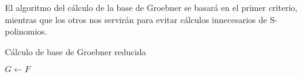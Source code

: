 El algoritmo del cálculo de la base de Groebner se basará en el primer criterio, mientras que los otros nos servirán para evitar cálculos innecesarios de S-polinomios.

\begin{algorithm}[hbt!]
  \caption{Cálculo de base de Groebner reducida}\label{alg:two}

  $G\gets F$\;


\end{algorithm}